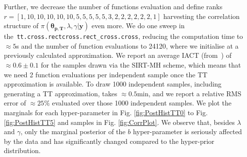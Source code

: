 Further, we decrease the number of functions evaluation and define ranks \linebreak$r = [ 1,  10,  10, 10, 10, 10, 5, 5, 5, 5, 5, 3, 2, 2, 2, 2, 2, 2, 1]$ harvesting the correlation structure of $\pi(\bm{\theta}_{\bm{p}, \bm{T}},\lambda,\gamma  | \bm{y})$ even more.
We do one sweep in \linebreak the~\texttt{tt.cross.rectcross.rect\_cross.cross}, reducing the computation time to $\approx 5$s and the number of function evaluations to 24120, where we initialise at a previously calculated approximation.
We report an average IACT (from~\cite{wolff2004monte, drikHesse}) of $\approx 0.6 \pm 0.1$ for the samples drawn via the SIRT-MH scheme, which means that we need 2 function evaluations per independent sample once the TT approximation is available.
To draw 1000 independent samples, including generating a TT approximation, takes $\approx0.5$min, and we report a relative RMS error of $\approx 25 \%$ evaluated over those 1000 independent samples.
We plot the marginals for each hyper-parameter in Fig. \ref{fig:PostHistTT0} to Fig. \ref{fig:PostHistTT5} and samples in Fig. \ref{fig:CorrPlot}.
We observe that, besides $\lambda$ and $\gamma$, only the marginal posterior of the $b$ hyper-parameter is seriously affected by the data and has significantly changed compared to the hyper-prior distribution.
\clearpage


